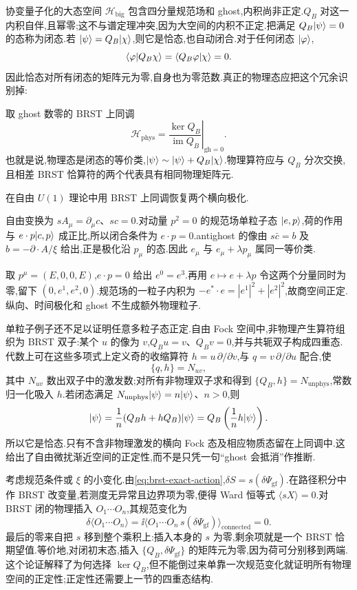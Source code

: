 协变量子化的大态空间 $\mathcal H_{\mathrm{big}}$ 包含四分量规范场和 ghost,内积尚非正定.$Q_B$ 对这一内积自伴,且幂零;这不与谱定理冲突,因为大空间的内积不正定.把满足 $Q_B\lvert \psi\rangle=0$ 的态称为闭态.若 $\lvert \psi\rangle=Q_B\lvert \chi\rangle$,则它是恰态,也自动闭合.对于任何闭态 $\lvert \varphi\rangle$,
\[
 \langle \varphi\vert Q_B\chi\rangle=\langle Q_B\varphi\vert \chi\rangle=0.
\]
因此恰态对所有闭态的矩阵元为零,自身也为零范数.真正的物理态应把这个冗余识别掉:
\begin{definition}[物理态空间]
取 ghost 数零的 BRST 上同调
\[
 \mathcal H_{\mathrm{phys}}
 =\left.\frac{\ker Q_B}{\operatorname{im}Q_B}\right|_{\mathrm{gh}=0}.
\]
也就是说,物理态是闭态的等价类,$\lvert \psi\rangle\sim\lvert \psi\rangle+Q_B\lvert \chi\rangle$.物理算符应与 $Q_B$ 分次交换,且相差 BRST 恰算符的两个代表具有相同物理矩阵元.
\end{definition}

\begin{example}
在自由 $U(1)$ 理论中用 BRST 上同调恢复两个横向极化.
\end{example}
\begin{solution}
自由变换为 $sA_\mu=\partial_\mu c$、$sc=0$.对动量 $p^2=0$ 的规范场单粒子态 $\lvert e,p\rangle$,荷的作用与 $e\cdot p\lvert c,p\rangle$ 成正比,所以闭合条件为 $e\cdot p=0$.antighost 的像由 $s\bar c=b$ 及 $b=-\partial\cdot A/\xi$ 给出,正是极化沿 $p_\mu$ 的态.因此 $e_\mu$ 与 $e_\mu+\lambda p_\mu$ 属同一等价类.

取 $p^\mu=(E,0,0,E)$,$e\cdot p=0$ 给出 $e^0=e^3$.再用 $e\mapsto e+\lambda p$ 令这两个分量同时为零,留下 $(0,e^1,e^2,0)$.规范场的一粒子内积为 $-e^*\cdot e=|e^1|^2+|e^2|^2$,故商空间正定.纵向、时间极化和 ghost 不生成额外物理粒子.
\end{solution}

单粒子例子还不足以证明任意多粒子态正定.自由 Fock 空间中,非物理产生算符组织为 BRST 双子:某个 $u$ 的像为 $v$,$Q_Bu=v$、$Q_Bv=0$,并与共轭双子构成四重态.代数上可在这些多项式上定义奇的收缩算符 $h=u\,\partial/\partial v$,与 $q=v\,\partial/\partial u$ 配合,使
\[
 \{q,h\}=N_{uv},
\]
其中 $N_{uv}$ 数出双子中的激发数;对所有非物理双子求和得到 $\{Q_B,h\}=N_{\mathrm{unphys}}$,常数归一化吸入 $h$.若闭态满足 $N_{\mathrm{unphys}}\lvert \psi\rangle=n\lvert \psi\rangle$、$n>0$,则
\[
 \lvert \psi\rangle=\frac1n(Q_Bh+hQ_B)\lvert \psi\rangle
 =Q_B\left(\frac1n h\lvert \psi\rangle\right).
\]
所以它是恰态.只有不含非物理激发的横向 Fock 态及相应物质态留在上同调中.这给出了自由微扰渐近空间的正定性,而不是只凭一句“ghost 会抵消”作推断.

考虑规范条件或 $\xi$ 的小变化.由\eqref{eq:brst-exact-action},$\delta S=s(\delta\mathcal\Psi_{\mathrm{gf}})$.在路径积分中作 BRST 改变量,若测度无异常且边界项为零,便得 Ward 恒等式 $\langle sX\rangle=0$.对 BRST 闭的物理插入 $O_1\cdots O_n$,其规范变化为
\[
 \delta\langle O_1\cdots O_n\rangle
 =\ii\langle O_1\cdots O_n\,s(\delta\mathcal\Psi_{\mathrm{gf}})\rangle_{\mathrm{connected}}=0.
\]
最后的零来自把 $s$ 移到整个乘积上:插入本身的 $s$ 为零,剩余项就是一个 BRST 恰期望值.等价地,对闭初末态,插入 $\{Q_B,\delta\mathcal\Psi_{\mathrm{gf}}\}$ 的矩阵元为零,因为荷可分别移到两端.这个论证解释了为何选择 $\ker Q_B$,但不能倒过来单靠一次规范变化就证明所有物理空间的正定性;正定性还需要上一节的四重态结构.


